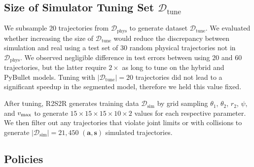 \documentclass[letterpaper, 10pt, conference]{ieeeconf}  %
\newcommand{\ba}{\mathbf{a}}
\newcommand{\bs}{\mathbf{s}}
\newcommand{\vmax}{v_{\rm max}}
\newcommand{\dtune}{\mathcal{D}_\textrm{tune}}
\newcommand{\dsim}{\mathcal{D}_\textrm{sim}}
\newcommand{\dreal}{\mathcal{D}_\textrm{phys}}
\begin{document}
\subsection{Size of Simulator Tuning Set $\dtune$}
We subsample 20 trajectories from $\dreal$ to generate dataset $\dtune$. We evaluated whether increasing the size of $\dtune$ would reduce the discrepancy between simulation and real using a test set of 30 random physical trajectories not in $\dreal$. We observed negligible difference in test errors between using 20 and 60 trajectories, but the latter require $2\times$ as long to tune on the hybrid and PyBullet models. Tuning with $|\dtune|=20$ trajectories did not lead to a significant speedup in the segmented model, therefore we held this value fixed. %

After tuning, R2S2R generates training data $\dsim$ by grid sampling $\theta_1$, $\theta_2$, $r_2$, $\psi$, and $\vmax$ to generate $15\times15\times15\times10\times2$ values for each respective parameter. We then filter out any trajectories that violate joint limits or with collisions to generate $|\dsim| = 21,450$ $(\ba, \bs)$ simulated trajectories.

\subsection{Policies}\label{ssec:method}
\end{document}
